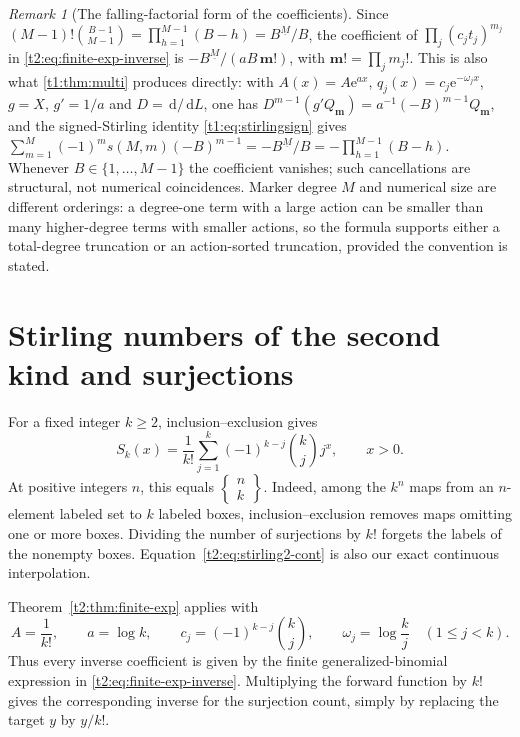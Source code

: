 \documentclass[11pt,openany]{book}
\numberwithin{equation}{chapter}
\theoremstyle{plain}
\theoremstyle{definition}
\theoremstyle{remark}
\newtheorem{remark}[theorem]{Remark}
\newcommand{\ee}{\mathrm e}
\newcommand{\dd}{\,\mathrm d}                 %
\newcommand{\fall}[2]{#1^{\underline{#2}}}
\newcommand{\StirII}[2]{\left\{\begin{matrix}#1\\#2\end{matrix}\right\}}
\newcommand{\sone}[2]{s(#1,#2)}
\begin{document}
\begin{remark}[The falling-factorial form of the coefficients]
\label{ct:rmk:falling}
Since $(M-1)!\binom{B-1}{M-1}=\prod_{h=1}^{M-1}(B-h)=\fall{B}{M}/B$, the
coefficient of $\prod_j(c_jt_j)^{m_j}$ in \cref{t2:eq:finite-exp-inverse}
is $-\fall{B}{M}/(aB\,\bm m!)$, with $\bm m!=\prod_jm_j!$.  This is also what
\cref{t1:thm:multi} produces directly: with $A(x)=A\ee^{ax}$,
$q_j(x)=c_j\ee^{-\omega_jx}$, $g=X$, $g'=1/a$ and $D=\dd/\dd L$, one has
$D^{m-1}(g'Q_{\bm m})=a^{-1}(-B)^{m-1}Q_{\bm m}$, and the signed-Stirling
identity \cref{t1:eq:stirlingsign} gives
$\sum_{m=1}^{M}(-1)^m\sone{M}{m}(-B)^{m-1}=-\fall{B}{M}/B=-\prod_{h=1}^{M-1}(B-h)$.
Whenever $B\in\{1,\ldots,M-1\}$ the coefficient vanishes; such cancellations
are structural, not numerical coincidences.  Marker degree $M$ and
numerical size are different orderings: a degree-one term with a large
action can be smaller than many higher-degree terms with smaller actions,
so the formula supports either a total-degree truncation or an
action-sorted truncation, provided the convention is stated.
\end{remark}

\section{Stirling numbers of the second kind and surjections}

For a fixed integer $k\ge2$, inclusion--exclusion gives
\begin{equation}
 S_k(x)=\frac1{k!}\sum_{j=1}^k(-1)^{k-j}\binom{k}{j}j^x,
 \qquad x>0.
 \label{t2:eq:stirling2-cont}
\end{equation}
At positive integers $n$, this equals $\StirII nk$. Indeed, among the $k^n$ maps from an $n$-element labeled set to $k$ labeled boxes, inclusion--exclusion removes maps omitting one or more boxes. Dividing the number of surjections by $k!$ forgets the labels of the nonempty boxes. Equation~\eqref{t2:eq:stirling2-cont} is also our exact continuous interpolation.

Theorem~\ref{t2:thm:finite-exp} applies with
\begin{equation}
 A=\frac1{k!},\qquad a=\log k,\qquad
 c_j=(-1)^{k-j}\binom{k}{j},\qquad
 \omega_j=\log\frac{k}{j}\quad(1\le j<k).
 \label{t2:eq:stirling2-params}
\end{equation}
Thus every inverse coefficient is given by the finite generalized-binomial expression in \eqref{t2:eq:finite-exp-inverse}. Multiplying the forward function by $k!$ gives the corresponding inverse for the surjection count, simply by replacing the target $y$ by $y/k!$.
\end{document}
